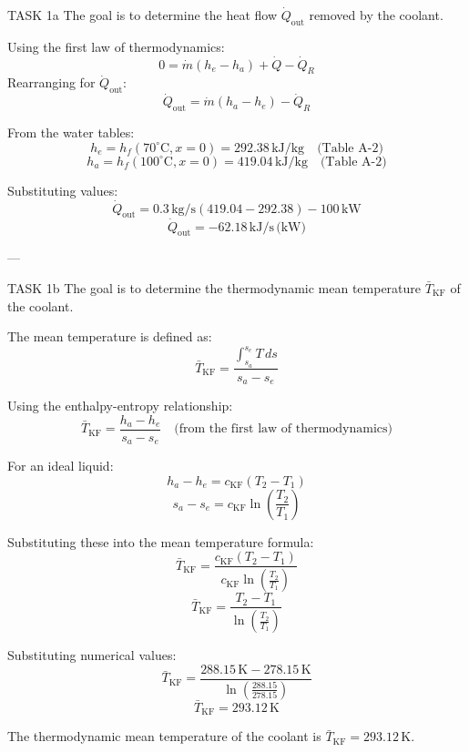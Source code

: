 TASK 1a  
The goal is to determine the heat flow \( \dot{Q}_{\text{out}} \) removed by the coolant.  

Using the first law of thermodynamics:  
\[
0 = \dot{m}(h_e - h_a) + \dot{Q} - \dot{Q}_R
\]  
Rearranging for \( \dot{Q}_{\text{out}} \):  
\[
\dot{Q}_{\text{out}} = \dot{m}(h_a - h_e) - \dot{Q}_R
\]  

From the water tables:  
\[
h_e = h_f(70^\circ\text{C}, x=0) = 292.38 \, \text{kJ/kg} \quad \text{(Table A-2)}
\]  
\[
h_a = h_f(100^\circ\text{C}, x=0) = 419.04 \, \text{kJ/kg} \quad \text{(Table A-2)}
\]  

Substituting values:  
\[
\dot{Q}_{\text{out}} = 0.3 \, \text{kg/s} \left( 419.04 - 292.38 \right) - 100 \, \text{kW}
\]  
\[
\dot{Q}_{\text{out}} = -62.18 \, \text{kJ/s} \, \text{(kW)}
\]  

---

TASK 1b  
The goal is to determine the thermodynamic mean temperature \( \bar{T}_{\text{KF}} \) of the coolant.  

The mean temperature is defined as:  
\[
\bar{T}_{\text{KF}} = \frac{\int_{s_a}^{s_e} T \, ds}{s_a - s_e}
\]  

Using the enthalpy-entropy relationship:  
\[
\bar{T}_{\text{KF}} = \frac{h_a - h_e}{s_a - s_e} \quad \text{(from the first law of thermodynamics)}
\]  

For an ideal liquid:  
\[
h_a - h_e = c_{\text{KF}}(T_2 - T_1)
\]  
\[
s_a - s_e = c_{\text{KF}} \ln \left( \frac{T_2}{T_1} \right)
\]  

Substituting these into the mean temperature formula:  
\[
\bar{T}_{\text{KF}} = \frac{c_{\text{KF}}(T_2 - T_1)}{c_{\text{KF}} \ln \left( \frac{T_2}{T_1} \right)}
\]  
\[
\bar{T}_{\text{KF}} = \frac{T_2 - T_1}{\ln \left( \frac{T_2}{T_1} \right)}
\]  

Substituting numerical values:  
\[
\bar{T}_{\text{KF}} = \frac{288.15 \, \text{K} - 278.15 \, \text{K}}{\ln \left( \frac{288.15}{278.15} \right)}
\]  
\[
\bar{T}_{\text{KF}} = 293.12 \, \text{K}
\]  

The thermodynamic mean temperature of the coolant is \( \bar{T}_{\text{KF}} = 293.12 \, \text{K} \).